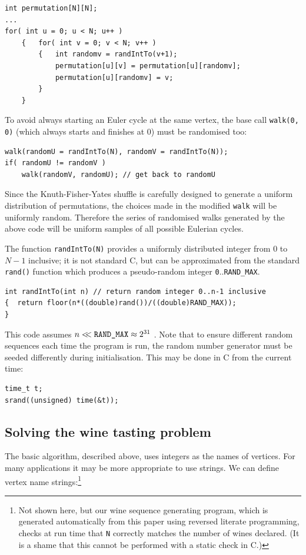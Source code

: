 \documentclass[12pt]{article}
\begin{document}
\begin{verbatim}
int permutation[N][N];
...
for( int u = 0; u < N; u++ )
    {   for( int v = 0; v < N; v++ )
        {   int randomv = randIntTo(v+1);
            permutation[u][v] = permutation[u][randomv];
            permutation[u][randomv] = v;
        }
    }
\end{verbatim}

To avoid always starting an Euler cycle at the same vertex, the base call \texttt{walk(0, 0)} (which always starts and finishes at 0) must be randomised too:

\begin{verbatim}
walk(randomU = randIntTo(N), randomV = randIntTo(N));
if( randomU != randomV )
    walk(randomV, randomU); // get back to randomU
\end{verbatim}

Since the Knuth-Fisher-Yates shuffle is carefully designed to generate a uniform distribution of permutations, the choices made in the modified \texttt{walk} will be uniformly random. Therefore the series of randomised walks generated by the above code will be uniform samples of all possible Eulerian cycles.

The function \texttt{randIntTo(N)} provides a uniformly distributed integer from $0$ to $N-1$ inclusive; it is not standard C, but can be approximated from the standard \texttt{rand()} function which produces a pseudo-random integer \texttt{0}..\texttt{RAND\_MAX}. 

\begin{verbatim}
int randIntTo(int n) // return random integer 0..n-1 inclusive
{  return floor(n*((double)rand())/((double)RAND_MAX));
}
\end{verbatim}

This code assumes $n<\!\!<\mbox{\tt RAND\_MAX}\approx 2^{31}$ \cite[p119]{knuth2}. Note that to ensure different random sequences each time the program is run, the random number generator must be seeded differently during initialisation. This may be done in C from the current time:

\begin{verbatim}
time_t t;
srand((unsigned) time(&t)); 
\end{verbatim}

\subsection{Solving the wine tasting problem}
The basic algorithm, described above, uses integers as the names of vertices. For many applications it may be more appropriate to use strings. We can define vertex name strings:\footnote{Not shown here, but our wine sequence generating program, which is generated automatically from this paper using reversed literate programming, checks at run time that \texttt{N} correctly matches the number of wines declared. (It is a shame that this cannot be performed with a static check in C.)}
\end{document}
